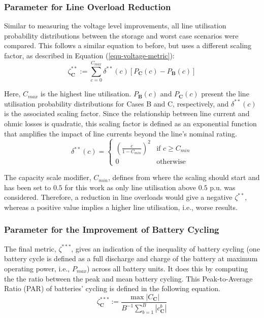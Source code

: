 \subsubsection{Parameter for Line Overload Reduction}

Similar to measuring the voltage level improvements, all line utilisation probability distributions between the storage and worst case scenarios were compared. This follows a similar equation to before, but uses a different scaling factor, as described in Equation (\ref{equ-voltage-metric}):
\begin{equation}
 \zeta_\textbf{C}^{**} := \sum_{c = 0}^{C_{max}} \delta^{**}(c) \left[P_\textbf{C}(c) - P_\textbf{B}(c)\right]
 \label{equ-utilisation-metric}
\end{equation}

Here, $C_{max}$ is the highest line utilisation. $P_\textbf{B}(c)$ and $P_\textbf{C}(c)$ present the line utilisation probability distributions for Cases {B} and {C}, respectively, and $\delta^{**}(c)$ is the associated scaling factor. Since the relationship between line current and ohmic losses is quadratic, this scaling factor is defined as an exponential function that amplifies the impact of line currents beyond the line's nominal rating.
\begin{equation}
 \delta^{**}(c) = 
 \begin{cases} 
 \left(\frac{c}{1-C_{min}}\right)^2 & \text{if } c \geq C_{min} \\
 0 & \text{otherwise}
 \end{cases}
\end{equation}

The capacity scale modifier, $C_{min}$, defines from where the scaling should start and has been set to $0.5$ for this work as only line utilisation above $0.5$ p.u. was considered. Therefore, a reduction in line overloads would give a negative $\zeta^{**}$, whereas a positive value implies a higher line utilisation, i.e., worse results.

\subsubsection{Parameter for the Improvement of Battery Cycling}
\label{subsubsec-zeta-3}

The final metric, $\zeta^{***}$, gives an indication of the inequality of battery cycling (one battery cycle is defined as a full discharge and charge of the battery at maximum operating power, i.e., $P_{max}$) across all battery units. It does this by computing the the ratio between the peak and mean battery cycling. This Peak-to-Average Ratio (PAR) of batteries' cycling is defined in the following equation.
\begin{equation}
 \zeta_\textbf{C}^{***} := \frac{\max \left|C_\textbf{C}\right|}{B^{-1} \sum_{b=1}^B{\left|c_\textbf{C}^b\right|}}
 \label{equ-par}
\end{equation}

